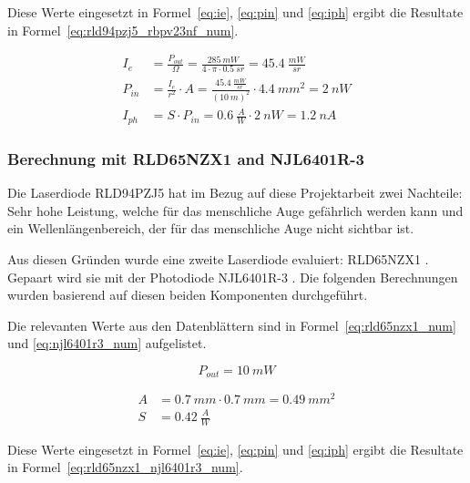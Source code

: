 Diese Werte eingesetzt in Formel~\ref{eq:ie}, \ref{eq:pin} und \ref{eq:iph} ergibt die Resultate in
Formel~\ref{eq:rld94pzj5_rbpv23nf_num}.

\begin{equation}\label{eq:rld94pzj5_rbpv23nf_num}
    \begin{split}
        I_e    &= \frac{P_{out}}{\Omega} = \frac{285~mW}{4\cdot \pi \cdot 0.5~sr} = 45.4~\frac{mW}{sr}\\
        P_{in} &= \frac{I_e}{r^2} \cdot A = \frac{45.4~\frac{mW}{sr}}{(10~m)^2} \cdot 4.4~mm^2 = 2~nW\\
        I_{ph} &= S \cdot P_{in} = 0.6~\frac{A}{W} \cdot 2~nW = 1.2~nA
    \end{split}
\end{equation}

\subsubsection{Berechnung mit RLD65NZX1 and NJL6401R-3}

Die Laserdiode RLD94PZJ5 hat im Bezug auf diese Projektarbeit zwei Nachteile: Sehr hohe Leistung, welche für das
menschliche Auge gefährlich werden kann und ein Wellenlängenbereich, der für das menschliche Auge nicht sichtbar ist.

Aus diesen Gründen wurde eine zweite Laserdiode evaluiert: RLD65NZX1 \cite{rohm2019rld65nzx1_datasheet}. Gepaart wird
sie mit der Photodiode NJL6401R-3 \cite{jrc2014njl6401r3_datasheet}. Die folgenden Berechnungen wurden basierend auf
diesen beiden Komponenten durchgeführt.

Die relevanten Werte aus den Datenblättern sind in Formel~\ref{eq:rld65nzx1_num} und \ref{eq:njl6401r3_num} aufgelistet.

\begin{equation}\label{eq:rld65nzx1_num}
    P_{out} = 10~mW
\end{equation}

\begin{equation}\label{eq:njl6401r3_num}
    \begin{split}
        A &= 0.7~mm \cdot 0.7~mm = 0.49~mm^2\\
        S &= 0.42~\frac{A}{W}
    \end{split}
\end{equation}

Diese Werte eingesetzt in Formel~\ref{eq:ie}, \ref{eq:pin} und \ref{eq:iph} ergibt die Resultate in
Formel~\ref{eq:rld65nzx1_njl6401r3_num}.

